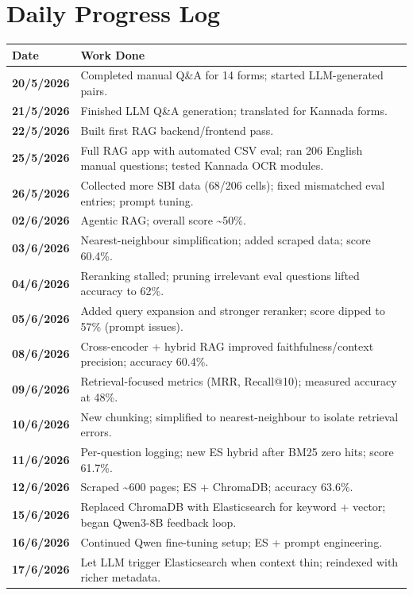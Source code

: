 \documentclass[11pt,a4paper]{article}
\begin{document}
\section{Daily Progress Log}

\begin{longtable}{@{}>{\bfseries}p{}p{}@{}}
\toprule
Date & Work Done \\
\midrule
\endhead
20/5/2026 & Completed manual Q\&A for 14 forms; started LLM-generated pairs. \\
21/5/2026 & Finished LLM Q\&A generation; translated for Kannada forms. \\
22/5/2026 & Built first RAG backend/frontend pass. \\
25/5/2026 & Full RAG app with automated CSV eval; ran 206 English manual questions; tested Kannada OCR modules. \\
26/5/2026 & Collected more SBI data (68/206 cells); fixed mismatched eval entries; prompt tuning. \\
02/6/2026 & Agentic RAG; overall score \textasciitilde50\%. \\
03/6/2026 & Nearest-neighbour simplification; added scraped data; score 60.4\%. \\
04/6/2026 & Reranking stalled; pruning irrelevant eval questions lifted accuracy to 62\%. \\
05/6/2026 & Added query expansion and stronger reranker; score dipped to 57\% (prompt issues). \\
08/6/2026 & Cross-encoder + hybrid RAG improved faithfulness/context precision; accuracy 60.4\%. \\
09/6/2026 & Retrieval-focused metrics (MRR, Recall@10); measured accuracy at 48\%. \\
10/6/2026 & New chunking; simplified to nearest-neighbour to isolate retrieval errors. \\
11/6/2026 & Per-question logging; new ES hybrid after BM25 zero hits; score 61.7\%. \\
12/6/2026 & Scraped \textasciitilde600 pages; ES + ChromaDB; accuracy 63.6\%. \\
15/6/2026 & Replaced ChromaDB with Elasticsearch for keyword + vector; began Qwen3-8B feedback loop. \\
16/6/2026 & Continued Qwen fine-tuning setup; ES + prompt engineering. \\
17/6/2026 & Let LLM trigger Elasticsearch when context thin; reindexed with richer metadata. \\

\end{longtable}
\end{document}
